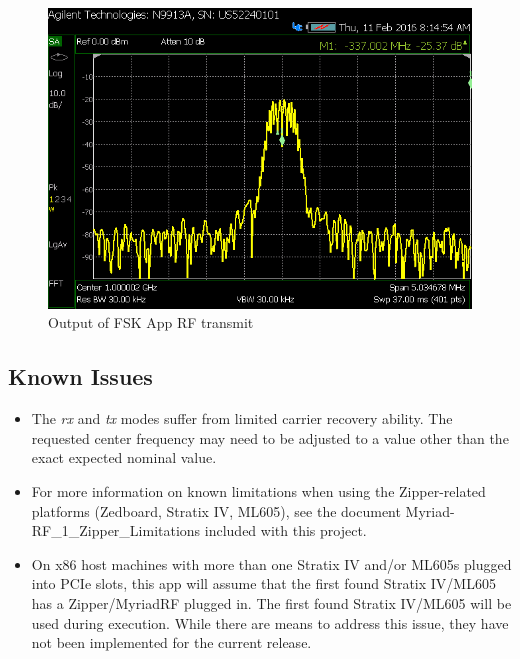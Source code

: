 \begin{figure}[ht]
\begin{minipage}{.45\textwidth}
			\centering\includegraphics[width=1.0\linewidth]{tx_spec_an}
			\caption{Output of FSK App RF transmit}
			\label{fig:tx_spec_an}
		\end{minipage}
	\end{figure}
\pagebreak
\subsection{Known Issues}
\noindent
\begin{itemize}
  \item The \textit{rx} and \textit{tx} modes suffer from limited carrier recovery ability. The requested center frequency may need to be adjusted to a value other than the exact expected nominal value.
  \item For more information on known limitations when using the Zipper-related platforms (Zedboard, Stratix IV, ML605), see the document Myriad-RF\_1\_Zipper\_Limitations included with this project.
  \item  On x86 host machines with more than one Stratix IV and/or ML605s plugged into PCIe slots, this app will assume that the first found Stratix IV/ML605 has a Zipper/MyriadRF plugged in. The first found Stratix IV/ML605 will be used during execution. While there are means to address this issue, they have not been implemented for the current release.
\end{itemize}

